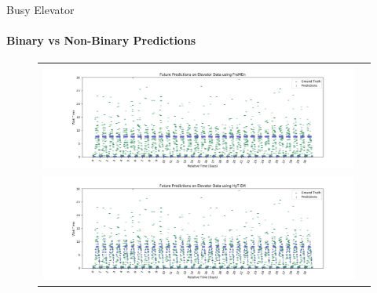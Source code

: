 \documentclass{beamer}
\begin{document}
\begin{frame}[t]{Busy Elevator}
 \framesubtitle{Binary vs Non-Binary Predictions}

 \vspace*{-1.6cm}
 \hspace*{-1.0cm}
  \begin{figure}[!Hp]
    \begin{tabular}{cc}
      {\includegraphics[width = 4.25in]{images/results/Future_elevator_FreMEn.png}} \\
      {\includegraphics[width = 4.25in]{images/results/Future_elevator_HyT-EM.png}}
    \end{tabular}
  \end{figure}

\end{frame}
\end{document}
